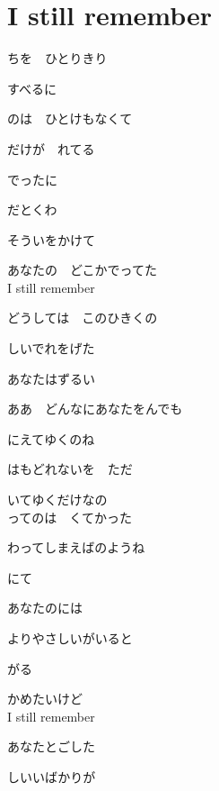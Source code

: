 \section{ I still remember}
\large{

ちを　ひとりきり

すべるに

のは　ひとけもなくて

だけが　れてる

でったに

だとくわ

そういをかけて

あなたの　どこかでってた
\\

I still remember

どうしては　このひきくの

しいでれをげた

あなたはずるい

ああ　どんなにあなたをんでも

にえてゆくのね

はもどれないを　ただ

いてゆくだけなの
\\

ってのは　くてかった

わってしまえばのようね

にて

あなたのには

よりやさしいがいると

がる

かめたいけど
\\

I still remember

あなたとごした

しいいばかりが

}
